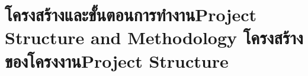 \chapter{\ifproject%
\ifcpe โครงสร้างและขั้นตอนการทำงาน\else Project Structure and Methodology\fi
\else%
\ifcpe โครงสร้างของโครงงาน\else Project Structure\fi
\fi
}


\makeatletter


\makeatother

